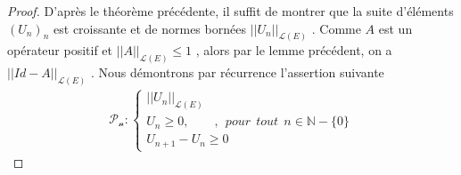 \documentclass{report}
\begin{document}
{\begin{proof}
D'après le théorème précédente, il suffit de montrer que la suite d'éléments $(U_n)_n$ est croissante et de normes bornées $||U_n||_{\mathscr{L}(E)}$ . Comme $A$ est un opérateur positif et $||A||_{\mathscr{L}(E)} \le 1$ , alors par le lemme précédent, on a $||Id - A||_{\mathscr{L}(E)}$ . Nous démontrons par récurrence l'assertion suivante 
														\begin{align*}
					 \mathscr{P_n} : \begin{cases}
										||U_n||_{\mathscr{L}(E)} \\
										U_n \ge 0, \quad \quad  , ~~ pour ~~ tout ~~ n \in \mathbb{N}-\{0\} \\
										U_{n+1} - U_n \ge 0
							   		  \end{cases}
														\end{align*}


\end{proof}}
\end{document}
